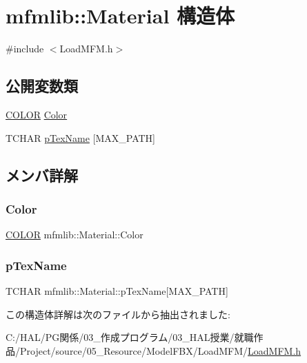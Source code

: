 \hypertarget{structmfmlib_1_1_material}{}\section{mfmlib\+:\+:Material 構造体}
\label{structmfmlib_1_1_material}


{\ttfamily \#include $<$Load\+M\+F\+M.\+h$>$}

\subsection*{公開変数類}
\begin{DoxyCompactItemize}
\item 
\mbox{\hyperlink{structmfmlib_1_1_c_o_l_o_r}{C\+O\+L\+OR}} \mbox{\hyperlink{structmfmlib_1_1_material_a620cca0ff3e33693e771d703704a6086}{Color}}
\item 
T\+C\+H\+AR \mbox{\hyperlink{structmfmlib_1_1_material_a10b07a0cae5af3ec9f47d5da4a8d35e2}{p\+Tex\+Name}} \mbox{[}M\+A\+X\+\_\+\+P\+A\+TH\mbox{]}
\end{DoxyCompactItemize}


\subsection{メンバ詳解}
\mbox{\label{structmfmlib_1_1_material_a620cca0ff3e33693e771d703704a6086}} 
\subsubsection{\texorpdfstring{Color}{Color}}
{\footnotesize\ttfamily \mbox{\hyperlink{structmfmlib_1_1_c_o_l_o_r}{C\+O\+L\+OR}} mfmlib\+::\+Material\+::\+Color}

\mbox{\label{structmfmlib_1_1_material_a10b07a0cae5af3ec9f47d5da4a8d35e2}} 
\subsubsection{\texorpdfstring{p\+Tex\+Name}{pTexName}}
{\footnotesize\ttfamily T\+C\+H\+AR mfmlib\+::\+Material\+::p\+Tex\+Name\mbox{[}M\+A\+X\+\_\+\+P\+A\+TH\mbox{]}}



この構造体詳解は次のファイルから抽出されました\+:\begin{DoxyCompactItemize}
\item 
C\+:/\+H\+A\+L/\+P\+G関係/03\+\_\+作成プログラム/03\+\_\+\+H\+A\+L授業/就職作品/\+Project/source/05\+\_\+\+Resource/\+Model\+F\+B\+X/\+Load\+M\+F\+M/\mbox{\hyperlink{_load_m_f_m_8h}{Load\+M\+F\+M.\+h}}\end{DoxyCompactItemize}
